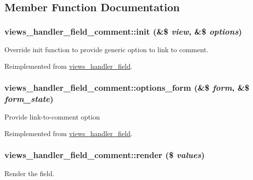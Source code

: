 \subsection{Member Function Documentation}
\hypertarget{classviews__handler__field__comment_a284d26dff5d2ddba3a2f692bf375d770}{
\subsubsection[{init}]{\setlength{\rightskip}{0pt plus 5cm}views\_\-handler\_\-field\_\-comment::init (\&\$ {\em view}, \/  \&\$ {\em options})}}
\label{classviews__handler__field__comment_a284d26dff5d2ddba3a2f692bf375d770}
Override init function to provide generic option to link to comment. 

Reimplemented from \hyperlink{classviews__handler__field_a3a290c7df3ead81e5cd244ad5335b1cc}{views\_\-handler\_\-field}.\hypertarget{classviews__handler__field__comment_a5afe1cb8daaae349f0f39b9ce0195753}{
\subsubsection[{options\_\-form}]{\setlength{\rightskip}{0pt plus 5cm}views\_\-handler\_\-field\_\-comment::options\_\-form (\&\$ {\em form}, \/  \&\$ {\em form\_\-state})}}
\label{classviews__handler__field__comment_a5afe1cb8daaae349f0f39b9ce0195753}
Provide link-\/to-\/comment option 

Reimplemented from \hyperlink{classviews__handler__field_a0435d161922b7b4b84f02a2e79bb947a}{views\_\-handler\_\-field}.\hypertarget{classviews__handler__field__comment_ac5e0fecfcd448920e3d837c1daed59fa}{
\subsubsection[{render}]{\setlength{\rightskip}{0pt plus 5cm}views\_\-handler\_\-field\_\-comment::render (\$ {\em values})}}
\label{classviews__handler__field__comment_ac5e0fecfcd448920e3d837c1daed59fa}
Render the field.


